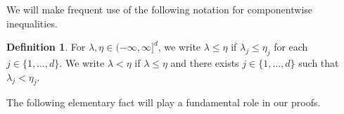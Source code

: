 \documentclass[11pt]{article}
\theoremstyle{plain}
\newtheorem{lem}[thm]{Lemma}
\theoremstyle{definition}
\newtheorem{defn}[thm]{Definition}
\numberwithin{equation}{section}
\def\alb#1\ale{\begin{align*}#1\end{align*}}
\newcommand{\BB}{\mathbbm}
\let\originalleft\left
\let\originalright\right
\renewcommand{\left}{\mathopen{}\mathclose\bgroup\originalleft}
\renewcommand{\right}{\aftergroup\egroup\originalright}
\begin{document}

We will make frequent use of the following notation for componentwise inequalities. 


\begin{defn} \label{def-componentwise}
For $\lambda,\eta\in (-\infty,\infty]^d$, we write $\lambda \leq \eta$ if $\lambda_j \leq \eta_j$ for each $j \in \{1,\dots,d\}$. We write $\lambda < \eta$ if $\lambda \leq \eta$ and there exists $j\in \{1,\dots,d\}$ such that $\lambda_j < \eta_j$. 
\end{defn}


The following elementary fact will play a fundamental role in our proofs. 
\end{document}
